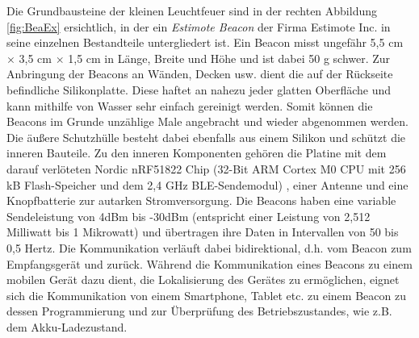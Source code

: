 Die Grundbausteine der kleinen Leuchtfeuer sind in der rechten Abbildung \ref{fig:BeaEx} ersichtlich, in der ein \textit{Estimote Beacon} der Firma Estimote Inc. in seine einzelnen Bestandteile untergliedert ist. Ein Beacon misst ungefähr 5,5 cm $\times$ 3,5 cm $\times$ 1,5 cm in Länge, Breite und Höhe und ist dabei 50 g schwer. Zur Anbringung der Beacons an Wänden, Decken usw. dient die auf der Rückseite befindliche Silikonplatte. Diese haftet an nahezu jeder glatten Oberfläche und kann mithilfe von Wasser sehr einfach gereinigt werden. Somit können die Beacons im Grunde unzählige Male angebracht und wieder abgenommen werden. Die äußere Schutzhülle besteht dabei ebenfalls aus einem Silikon und schützt die inneren Bauteile. Zu den inneren Komponenten gehören die Platine mit dem darauf verlöteten Nordic nRF51822 Chip (32-Bit ARM Cortex M0 CPU mit 256 kB Flash-Speicher und dem 2,4 GHz BLE-Sendemodul) \cite{nRF5}, einer Antenne und eine Knopfbatterie zur autarken Stromversorgung. Die Beacons haben eine variable Sendeleistung von 4dBm bis -30dBm (entspricht einer Leistung von 2,512 Milliwatt bis 1 Mikrowatt) und übertragen ihre Daten in Intervallen von 50 bis 0,5 Hertz. Die Kommunikation verläuft dabei bidirektional, d.h. vom Beacon zum Empfangsgerät und zurück. Während die Kommunikation eines Beacons zu einem mobilen Gerät dazu dient, die Lokalisierung des Gerätes zu ermöglichen, eignet sich die Kommunikation von einem Smartphone, Tablet etc. zu einem Beacon zu dessen Programmierung und zur Überprüfung des Betriebszustandes, wie z.B. dem Akku-Ladezustand. \\ \\

